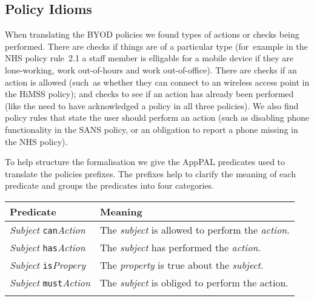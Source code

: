 \documentclass[a4paper]{article}
\begin{document}

\subsection{Policy Idioms}

When translating the \ac{BYOD} policies we found types of actions or checks being performed.
There are checks if things are of a particular type (for~example in the NHS policy rule~2.1  a staff member is elligable for a mobile device if they are lone-working, work out-of-hours and work out-of-office).  
There are checks if an action is allowed (such~as whether they can connect to an wireless access point in the \ac{HiMSS} policy);  and checks to see if an action has already been performed (like the need to have acknowledged a policy in all three policies).
We also find policy rules that state the user should perform an action (such as disabling phone functionality in the SANS policy, or an obligation to report a phone missing in the NHS policy).

To help structure the formalisation we give the AppPAL predicates used to translate the policies prefixes.
The prefixes help to clarify the meaning of each predicate and groups the predicates into four categories.

\begin{tabular}{l l}
  \toprule
  Predicate & Meaning \\
  \midrule
  \textit{Subject} \texttt{can}\textit{Action}  & The \emph{subject} is allowed to perform the \emph{action}. \\
  \textit{Subject} \texttt{has}\textit{Action}  & The \emph{subject} has performed the \emph{action}. \\
  \textit{Subject} \texttt{is}\textit{Propery}  & The \emph{property} is true about the \emph{subject}. \\
  \textit{Subject} \texttt{must}\textit{Action} & The \emph{subject} is obliged to perform the action. \\
  \bottomrule \\
\end{tabular}
\end{document}
